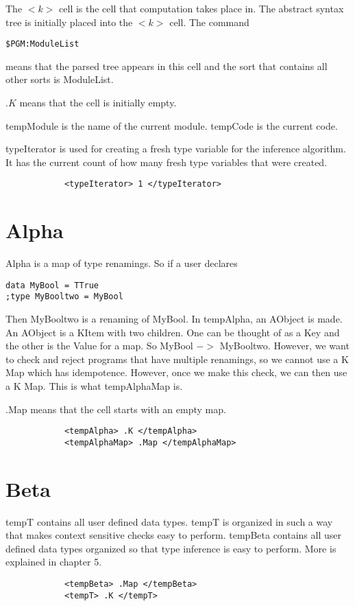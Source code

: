 The $<k>$ cell is the cell that computation takes place in.
The abstract syntax tree is initially placed into the $<k>$ cell.
The command
\begin{lstlisting}
$PGM:ModuleList
\end{lstlisting}
means that the parsed tree appears in this cell and the sort that contains all other sorts is ModuleList.

$.K$ means that the cell is initially empty.

tempModule is the name of the current module. tempCode is the current code.

typeIterator is used for creating a fresh type variable for the inference algorithm. It has the current count of how many fresh type variables that were created.

\begin{lstlisting}
            <typeIterator> 1 </typeIterator>
\end{lstlisting}

\section{Alpha}
Alpha is a map of type renamings. So if a user declares

\begin{lstlisting}
data MyBool = TTrue
;type MyBooltwo = MyBool
\end{lstlisting}

Then MyBooltwo is a renaming of MyBool. In tempAlpha, an AObject is made. An AObject is a KItem with two children. One can be thought of as a Key and the other is the Value for a map. So MyBool $->$ MyBooltwo. However, we want to check and reject programs that have multiple renamings, so we cannot use a K Map which has idempotence. However, once we make this check, we can then use a K Map. This is what tempAlphaMap is.

.Map means that the cell starts with an empty map.

\begin{lstlisting}
            <tempAlpha> .K </tempAlpha>
            <tempAlphaMap> .Map </tempAlphaMap>
\end{lstlisting}

\section{Beta}

tempT contains all user defined data types. tempT is organized in such a way that makes context sensitive checks easy to perform. tempBeta contains all user defined data types organized so that type inference is easy to perform. More is explained in chapter 5.
\begin{lstlisting}
            <tempBeta> .Map </tempBeta>
            <tempT> .K </tempT>
\end{lstlisting}

